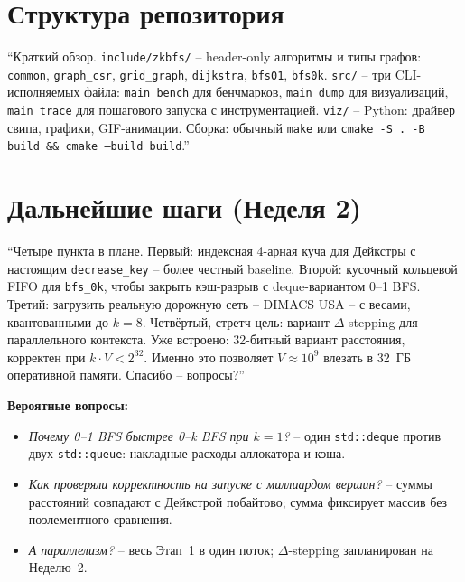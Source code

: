 \documentclass[11pt,a4paper]{article}
\begin{document}
\section{Структура репозитория}
``Краткий обзор. \texttt{include/zkbfs/} -- header-only алгоритмы и
типы графов: \texttt{common}, \texttt{graph\_csr}, \texttt{grid\_graph},
\texttt{dijkstra}, \texttt{bfs01}, \texttt{bfs0k}. \texttt{src/} -- три
CLI-исполняемых файла: \texttt{main\_bench} для бенчмарков,
\texttt{main\_dump} для визуализаций, \texttt{main\_trace} для
пошагового запуска с инструментацией. \texttt{viz/} -- Python:
драйвер свипа, графики, GIF-анимации. Сборка: обычный \texttt{make}
или \texttt{cmake -S . -B build \&\& cmake --build build}.''
\hrulefill

\section{Дальнейшие шаги (Неделя 2)}
``Четыре пункта в плане. Первый: индексная 4-арная куча для Дейкстры
с настоящим \texttt{decrease\_key} -- более честный baseline. Второй:
кусочный кольцевой FIFO для \texttt{bfs\_0k}, чтобы закрыть кэш-разрыв
с deque-вариантом 0--1 BFS. Третий: загрузить реальную дорожную сеть
-- DIMACS USA -- с весами, квантованными до $k=8$. Четвёртый,
стретч-цель: вариант $\Delta$-stepping для параллельного контекста.
Уже встроено: 32-битный вариант расстояния, корректен при $k \cdot V
< 2^{32}$. Именно это позволяет $V \approx 10^9$ влезать в 32~ГБ
оперативной памяти. Спасибо -- вопросы?''

\textbf{Вероятные вопросы:}
\begin{itemize}
\item \emph{Почему 0--1 BFS быстрее 0--k BFS при $k=1$?} -- один
\texttt{std::deque} против двух \texttt{std::queue}: накладные расходы
аллокатора и кэша.
\item \emph{Как проверяли корректность на запуске с миллиардом
вершин?} -- суммы расстояний совпадают с Дейкстрой побайтово; сумма
фиксирует массив без поэлементного сравнения.
\item \emph{А параллелизм?} -- весь Этап~1 в один поток;
$\Delta$-stepping запланирован на Неделю~2.
\end{itemize}
\end{document}
